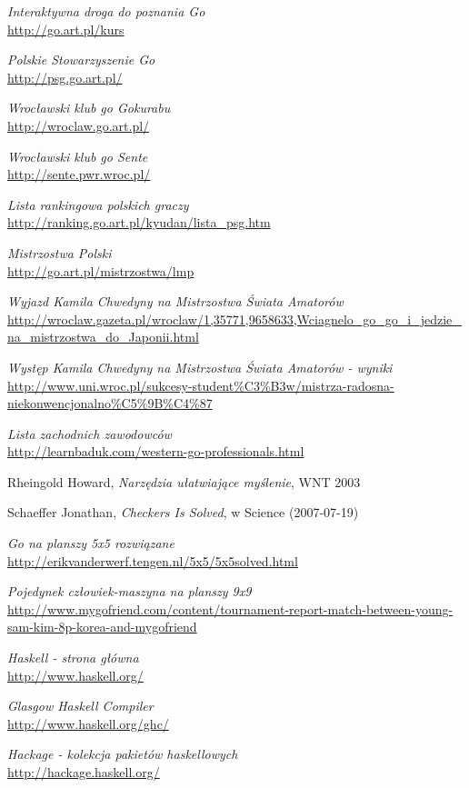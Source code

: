 \documentclass[11pt,leqno]{article}
\begin{document}
\begin{thebibliography}{9}

\small

  \emph{Interaktywna droga do poznania Go} \\
  \url{http://go.art.pl/kurs}

  \emph{Polskie Stowarzyszenie Go} \\
  \url{http://psg.go.art.pl/}

  \emph{Wrocławski klub go Gokurabu} \\
  \url{http://wroclaw.go.art.pl/}

  \emph{Wrocławski klub go Sente} \\
  \url{http://sente.pwr.wroc.pl/}

  \emph{Lista rankingowa polskich graczy} \\
  \url{http://ranking.go.art.pl/kyudan/lista\_psg.htm}

  \emph{Mistrzostwa Polski} \\
  \url{http://go.art.pl/mistrzostwa/lmp}

  \emph{Wyjazd Kamila Chwedyny na Mistrzostwa Świata Amatorów} \\
  \url{http://wroclaw.gazeta.pl/wroclaw/1,35771,9658633,Wciagnelo_go_go_i_jedzie_na_mistrzostwa_do_Japonii.html}

  \emph{Występ Kamila Chwedyny na Mistrzostwa Świata Amatorów - wyniki} \\
  \url{http://www.uni.wroc.pl/sukcesy-student%C3%B3w/mistrza-radosna-niekonwencjonalno%C5%9B%C4%87}

  \emph{Lista zachodnich zawodowców} \\
  \url{http://learnbaduk.com/western-go-professionals.html}

  Rheingold Howard, \emph{Narzędzia ułatwiające myślenie}, WNT 2003

  Schaeffer Jonathan, \emph{Checkers Is Solved}, w Science (2007-07-19)

  \emph{Go na planszy 5x5 rozwiązane} \\
  \url{http://erikvanderwerf.tengen.nl/5x5/5x5solved.html}

  \emph{Pojedynek człowiek-maszyna na planszy 9x9}
  \url{http://www.mygofriend.com/content/tournament-report-match-between-young-sam-kim-8p-korea-and-mygofriend}

  \emph{Haskell - strona główna} \\
  \url{http://www.haskell.org/}

  \emph{Glasgow Haskell Compiler} \\
  \url{http://www.haskell.org/ghc/}

  \emph{Hackage - kolekcja pakietów haskellowych} \\
  \url{http://hackage.haskell.org/}

\end{thebibliography}
\end{document}
